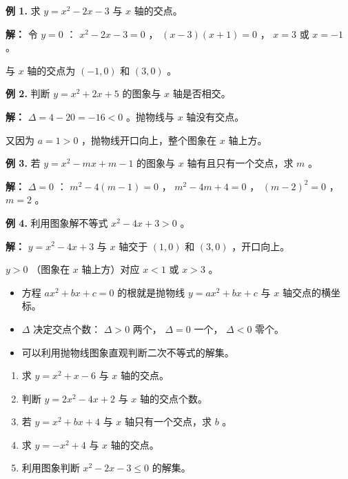 \begin{workedexamples}


\textbf{例 1.} 求 $y = x^2 - 2x - 3$ 与 $x$ 轴的交点。

\textbf{解：} 令 $y = 0$ ： $x^2 - 2x - 3 = 0$ ， $(x - 3)(x + 1) = 0$ ， $x = 3$ 或 $x = -1$ 。

与 $x$ 轴的交点为 $(-1, 0)$ 和 $(3, 0)$ 。

\textbf{例 2.} 判断 $y = x^2 + 2x + 5$ 的图象与 $x$ 轴是否相交。

\textbf{解：} $\Delta = 4 - 20 = -16 < 0$ 。抛物线与 $x$ 轴没有交点。

又因为 $a = 1 > 0$ ，抛物线开口向上，整个图象在 $x$ 轴上方。

\textbf{例 3.} 若 $y = x^2 - mx + m - 1$ 的图象与 $x$ 轴有且只有一个交点，求 $m$ 。

\textbf{解：} $\Delta = 0$ ： $m^2 - 4(m - 1) = 0$ ， $m^2 - 4m + 4 = 0$ ， $(m - 2)^2 = 0$ ， $m = 2$ 。

\textbf{例 4.} 利用图象解不等式 $x^2 - 4x + 3 > 0$ 。

\textbf{解：} $y = x^2 - 4x + 3$ 与 $x$ 轴交于 $(1, 0)$ 和 $(3, 0)$ ，开口向上。

$y > 0$ （图象在 $x$ 轴上方）对应 $x < 1$ 或 $x > 3$ 。

\end{workedexamples}

\begin{keytakeaway}


\begin{itemize}
  \item 方程 $ax^2 + bx + c = 0$ 的根就是抛物线 $y = ax^2 + bx + c$ 与 $x$ 轴交点的横坐标。
  \item $\Delta$ 决定交点个数： $\Delta > 0$ 两个， $\Delta = 0$ 一个， $\Delta < 0$ 零个。
  \item 可以利用抛物线图象直观判断二次不等式的解集。
\end{itemize}


\end{keytakeaway}

\begin{practice}


\begin{enumerate}
  \item 求 $y = x^2 + x - 6$ 与 $x$ 轴的交点。
  \item 判断 $y = 2x^2 - 4x + 2$ 与 $x$ 轴的交点个数。
  \item 若 $y = x^2 + bx + 4$ 与 $x$ 轴只有一个交点，求 $b$ 。
  \item 求 $y = -x^2 + 4$ 与 $x$ 轴的交点。
  \item 利用图象判断 $x^2 - 2x - 3 \leq 0$ 的解集。
\end{enumerate}


\end{practice}

